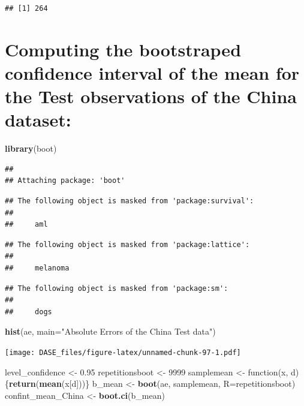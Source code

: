 \documentclass[]{book}
\newenvironment{Shaded}{\begin{snugshade}}{\end{snugshade}}
\newcommand{\KeywordTok}[1]{\textcolor[rgb]{0.13,0.29,0.53}{\textbf{{#1}}}}
\newcommand{\DataTypeTok}[1]{\textcolor[rgb]{0.13,0.29,0.53}{{#1}}}
\newcommand{\DecValTok}[1]{\textcolor[rgb]{0.00,0.00,0.81}{{#1}}}
\newcommand{\FloatTok}[1]{\textcolor[rgb]{0.00,0.00,0.81}{{#1}}}
\newcommand{\StringTok}[1]{\textcolor[rgb]{0.31,0.60,0.02}{{#1}}}
\newcommand{\NormalTok}[1]{{#1}}
\begin{document}
\begin{verbatim}
## [1] 264
\end{verbatim}

\section{Computing the bootstraped confidence interval of the mean for
the Test observations of the China
dataset:}\label{computing-the-bootstraped-confidence-interval-of-the-mean-for-the-test-observations-of-the-china-dataset}

\begin{Shaded}
\begin{Highlighting}[]
\KeywordTok{library}\NormalTok{(boot)}
\end{Highlighting}
\end{Shaded}

\begin{verbatim}
## 
## Attaching package: 'boot'
\end{verbatim}

\begin{verbatim}
## The following object is masked from 'package:survival':
## 
##     aml
\end{verbatim}

\begin{verbatim}
## The following object is masked from 'package:lattice':
## 
##     melanoma
\end{verbatim}

\begin{verbatim}
## The following object is masked from 'package:sm':
## 
##     dogs
\end{verbatim}

\begin{Shaded}
\begin{Highlighting}[]
\KeywordTok{hist}\NormalTok{(ae, }\DataTypeTok{main=}\StringTok{"Absolute Errors of the China Test data"}\NormalTok{)}
\end{Highlighting}
\end{Shaded}

\texttt{[image: DASE\_files/figure-latex/unnamed-chunk-97-1.pdf]}

\begin{Shaded}
\begin{Highlighting}[]
\NormalTok{level_confidence <-}\StringTok{ }\FloatTok{0.95}
\NormalTok{repetitionsboot <-}\StringTok{ }\DecValTok{9999}
\NormalTok{samplemean <-}\StringTok{ }\NormalTok{function(x, d)\{}\KeywordTok{return}\NormalTok{(}\KeywordTok{mean}\NormalTok{(x[d]))\}}
\NormalTok{b_mean <-}\StringTok{ }\KeywordTok{boot}\NormalTok{(ae, samplemean, }\DataTypeTok{R=}\NormalTok{repetitionsboot)}
\NormalTok{confint_mean_China <-}\StringTok{ }\KeywordTok{boot.ci}\NormalTok{(b_mean)}
\end{Highlighting}
\end{Shaded}
\end{document}
